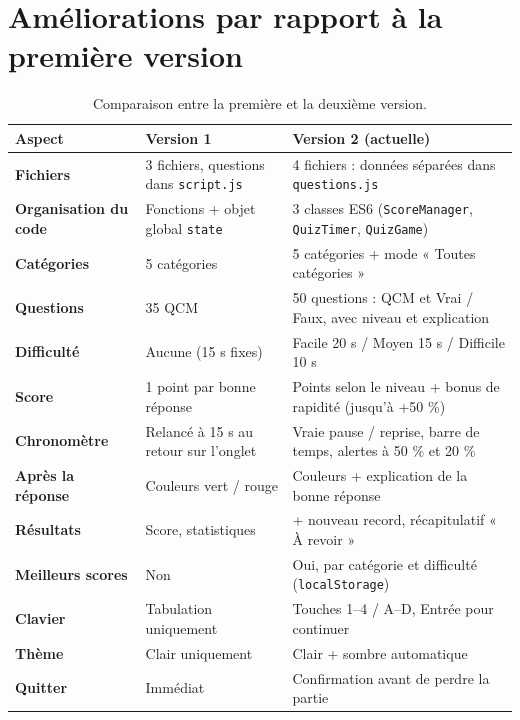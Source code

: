 \documentclass[11pt,a4paper]{article}
\begin{document}
\section{Améliorations par rapport à la première version}
\begin{table}[H]
\centering
\renewcommand{\arraystretch}{1.3}
\small
\begin{tabularx}{\linewidth}{@{}>{\bfseries}p{3.2cm} X X@{}}
\toprule
Aspect & Version 1 & Version 2 (actuelle) \\
\midrule
Fichiers & 3 fichiers, questions dans \texttt{script.js} & 4 fichiers : données séparées dans \texttt{questions.js} \\
Organisation du code & Fonctions + objet global \texttt{state} & 3 classes ES6 (\texttt{ScoreManager}, \texttt{QuizTimer}, \texttt{QuizGame}) \\
Catégories & 5 catégories & 5 catégories + mode « Toutes catégories » \\
Questions & 35 QCM & 50 questions : QCM et Vrai / Faux, avec niveau et explication \\
Difficulté & Aucune (15 s fixes) & Facile 20 s / Moyen 15 s / Difficile 10 s \\
Score & 1 point par bonne réponse & Points selon le niveau + bonus de rapidité (jusqu'à +50 \%) \\
Chronomètre & Relancé à 15 s au retour sur l'onglet & Vraie pause / reprise, barre de temps, alertes à 50 \% et 20 \% \\
Après la réponse & Couleurs vert / rouge & Couleurs + explication de la bonne réponse \\
Résultats & Score, statistiques & + nouveau record, récapitulatif « À revoir » \\
Meilleurs scores & Non & Oui, par catégorie et difficulté (\texttt{localStorage}) \\
Clavier & Tabulation uniquement & Touches 1--4 / A--D, Entrée pour continuer \\
Thème & Clair uniquement & Clair + sombre automatique \\
Quitter & Immédiat & Confirmation avant de perdre la partie \\
\bottomrule
\end{tabularx}
\caption{Comparaison entre la première et la deuxième version.}
\end{table}

\end{document}
